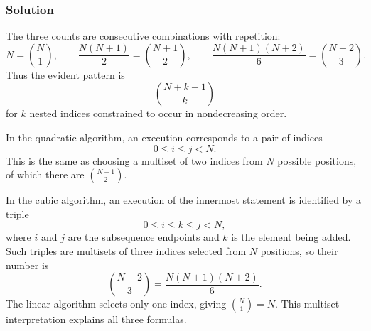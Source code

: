 \documentclass[12pt,a4paper]{article}
\begin{document}
\subsubsection*{\color{sectionnavy}Solution}

The three counts are consecutive combinations with repetition:
\[
N=\binom{N}{1},
\qquad
\frac{N(N+1)}2=\binom{N+1}{2},
\qquad
\frac{N(N+1)(N+2)}6=\binom{N+2}{3}.
\]
Thus the evident pattern is
\[
\boxed{\binom{N+k-1}{k}}
\]
for $k$ nested indices constrained to occur in nondecreasing order.

In the quadratic algorithm, an execution corresponds to a pair of
indices
\[
0\leq i\leq j<N.
\]
This is the same as choosing a multiset of two indices from $N$
possible positions, of which there are $\binom{N+1}{2}$.

In the cubic algorithm, an execution of the innermost statement is
identified by a triple
\[
0\leq i\leq k\leq j<N,
\]
where $i$ and $j$ are the subsequence endpoints and $k$ is the element
being added. Such triples are multisets of three indices selected from
$N$ positions, so their number is
\[
\binom{N+2}{3}=\frac{N(N+1)(N+2)}6.
\]
The linear algorithm selects only one index, giving
$\binom{N}{1}=N$. This multiset interpretation explains all three
formulas.
\end{document}
